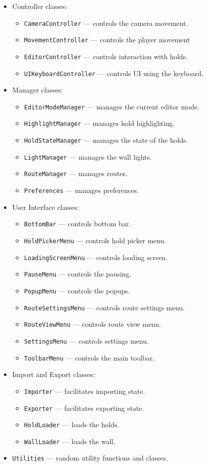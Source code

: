 \begin{itemize}
	\item Controller classes:
	\begin{itemize}
		\item \verb|CameraController| --- controls the camera movement.
		\item \verb|MovementController| --- controls the player movement
		\item \verb|EditorController| --- controls interaction with holds.
		\item \verb|UIKeyboardController| --- controls UI using the keyboard.
	\end{itemize}
	\item Manager classes:
	\begin{itemize}
		\item \verb|EditorModeManager| --- manages the current editor mode.
		\item \verb|HighlightManager| --- manages hold highlighting.
		\item \verb|HoldStateManager| --- manages the state of the holds.
		\item \verb|LightManager| --- manages the wall lights.
		\item \verb|RouteManager| --- manages routes.
		\item \verb|Preferences| --- manages preferences.
	\end{itemize}
	\item User Interface classes:
	\begin{itemize}
		\item \verb|BottomBar| --- controls bottom bar.
		\item \verb|HoldPickerMenu| --- controls hold picker menu.
		\item \verb|LoadingScreenMenu| --- controls loading screen.
		\item \verb|PauseMenu| --- controls the pausing.
		\item \verb|PopupMenu| --- controls the popups.
		\item \verb|RouteSettingsMenu| --- controls route settings menu.
		\item \verb|RouteViewMenu| --- controls route view menu.
		\item \verb|SettingsMenu| --- controls settings menu.
		\item \verb|ToolbarMenu| --- controls the main toolbar.
	\end{itemize}
	\item Import and Export classes:
	\begin{itemize}
		\item \verb|Importer| --- facilitates importing state.
		\item \verb|Exporter| --- facilitates exporting state.
		\item \verb|HoldLoader| --- loads the holds.
		\item \verb|WallLoader| --- loads the wall.
	\end{itemize}
	\item \verb|Utilities| --- random utility functions and classes.
\end{itemize}

